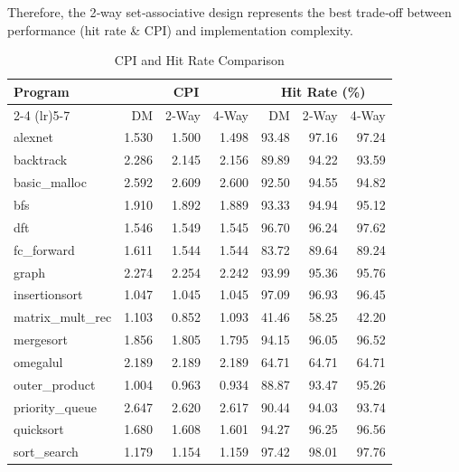 \noindent
Therefore, the 2‑way set‑associative design represents the best trade‑off between performance (hit rate \& CPI) and implementation complexity.
\begin{table}[ht]
\centering
\caption{CPI and Hit Rate Comparison}
\label{tab:cache-comparison}
\begin{tabular}{l
                rrr  %
                rrr} %
\toprule
Program & \multicolumn{3}{c}{CPI} & \multicolumn{3}{c}{Hit Rate (\%)} \\
\cmidrule(lr){2-4} \cmidrule(lr){5-7}
        & DM      & 2‑Way   & 4‑Way   & DM     & 2‑Way  & 4‑Way  \\
\midrule
alexnet             & 1.530 & 1.500 & 1.498 & 93.48 & 97.16 & 97.24 \\
backtrack           & 2.286 & 2.145 & 2.156 & 89.89 & 94.22 & 93.59 \\
basic\_malloc        & 2.592 & 2.609 & 2.600 & 92.50 & 94.55 & 94.82 \\
bfs                 & 1.910 & 1.892 & 1.889 & 93.33 & 94.94 & 95.12 \\
dft                 & 1.546 & 1.549 & 1.545 & 96.70 & 96.24 & 97.62 \\
fc\_forward         & 1.611 & 1.544 & 1.544 & 83.72 & 89.64 & 89.24 \\
graph               & 2.274 & 2.254 & 2.242 & 93.99 & 95.36 & 95.76 \\
insertionsort       & 1.047 & 1.045 & 1.045 & 97.09 & 96.93 & 96.45 \\
matrix\_mult\_rec   & 1.103 & 0.852 & 1.093 & 41.46 & 58.25 & 42.20 \\
mergesort           & 1.856 & 1.805 & 1.795 & 94.15 & 96.05 & 96.52 \\
omegalul            & 2.189 & 2.189 & 2.189 & 64.71 & 64.71 & 64.71 \\
outer\_product      & 1.004 & 0.963 & 0.934 & 88.87 & 93.47 & 95.26 \\
priority\_queue     & 2.647 & 2.620 & 2.617 & 90.44 & 94.03 & 93.74 \\
quicksort           & 1.680 & 1.608 & 1.601 & 94.27 & 96.25 & 96.56 \\
sort\_search        & 1.179 & 1.154 & 1.159 & 97.42 & 98.01 & 97.76 \\
\bottomrule
\end{tabular}
\end{table}